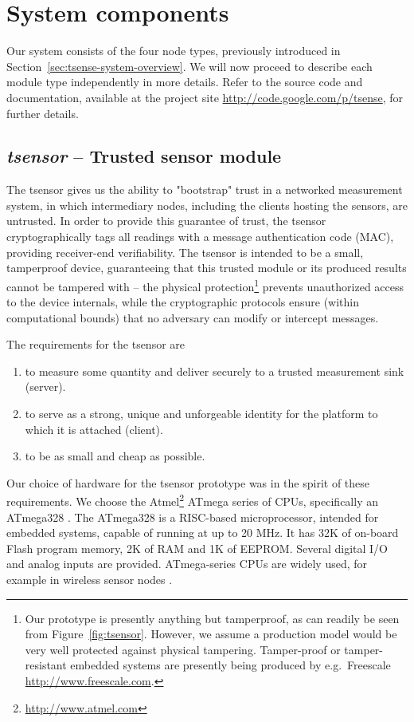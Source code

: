 \section{System components}

Our system consists of the four node types, previously introduced in Section~\ref{sec:tsense-system-overview}. We will now proceed to describe each module type independently in more details. Refer to the source code and documentation, available at the project site \url{http://code.google.com/p/tsense}, for further details.

\subsection{\textit{tsensor} -- Trusted sensor module}

The tsensor gives us the ability to "bootstrap" trust in a networked measurement system, in which intermediary nodes, including the clients hosting the sensors, are untrusted. In order to provide this guarantee of trust, the tsensor cryptographically tags all readings with a message authentication code (MAC), providing receiver-end verifiability. The tsensor is intended to be a small, tamperproof device, guaranteeing that this trusted module or its produced results cannot be tampered with -- the physical protection\footnote{Our prototype is presently anything but tamperproof, as can readily be seen from Figure~\ref{fig:tsensor}. However, we assume a production model would be very well protected against physical tampering. Tamper-proof or tamper-resistant embedded systems are presently being produced by e.g.\ Freescale \url{http://www.freescale.com}.} prevents unauthorized access to the device internals, while the cryptographic protocols ensure (within computational bounds) that no adversary can modify or intercept messages. 

The requirements for the tsensor are
\begin{enumerate}
\item to measure some quantity and deliver securely to a trusted measurement sink (server).
\item to serve as a strong, unique and unforgeable identity for the platform to which it is attached (client).
\item to be as small and cheap as possible.
\end{enumerate}

Our choice of hardware for the tsensor prototype was in the spirit of these requirements. We choose the Atmel\footnote{\url{http://www.atmel.com}} ATmega series of CPUs, specifically an ATmega328 \cite{atmel-atmega-series-2010}. The ATmega328 is a RISC-based microprocessor, intended for embedded systems, capable of running at up to 20 MHz. It has 32K of on-board Flash program memory, 2K of RAM and 1K of EEPROM. Several digital I/O and analog inputs are provided. ATmega-series CPUs are widely used, for example in wireless sensor nodes .

